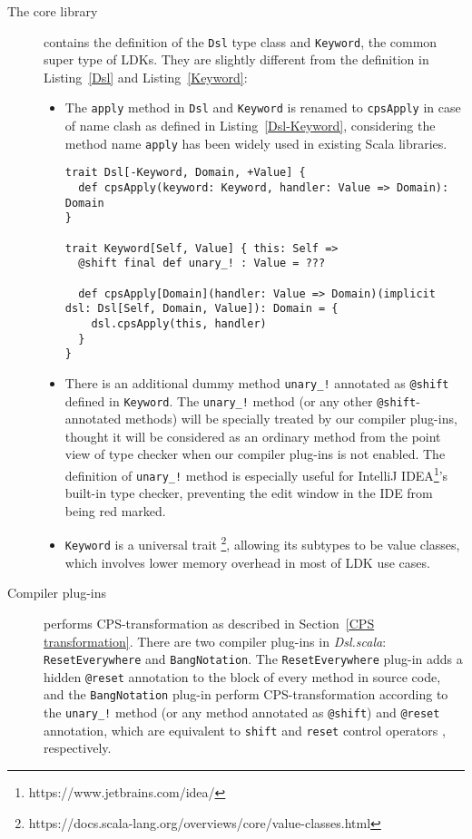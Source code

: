 \begin{description}
  \item[The core library] contains the definition of the \lstinline{Dsl} type class and \lstinline{Keyword}, the common super type of LDKs. They are slightly different from the definition in Listing~\ref{Dsl} and Listing~\ref{Keyword}:
  \begin{itemize}
    \item The \lstinline{apply} method in \lstinline{Dsl} and \lstinline{Keyword} is renamed to \lstinline{cpsApply} in case of name clash as defined in Listing~\ref{Dsl-Keyword}, considering the method name \lstinline{apply} has been widely used in existing Scala libraries.

    \begin{lstlisting}[caption={The definition of \lstinline{Dsl} and \lstinline{Keyword} in \textit{Dsl.scala}, renamed},label={Dsl-Keyword}]
trait Dsl[-Keyword, Domain, +Value] {
  def cpsApply(keyword: Keyword, handler: Value => Domain): Domain
}

trait Keyword[Self, Value] { this: Self =>
  @shift final def unary_! : Value = ???

  def cpsApply[Domain](handler: Value => Domain)(implicit dsl: Dsl[Self, Domain, Value]): Domain = {
    dsl.cpsApply(this, handler)
  }
}
    \end{lstlisting}


    \item There is an additional dummy method \lstinline{unary_!} annotated as \lstinline{@shift} defined in \lstinline{Keyword}. The \lstinline{unary_!} method (or any other \lstinline{@shift}-annotated methods) will be specially treated by our compiler plug-ins, thought it will be considered as an ordinary method from the point view of type checker when our compiler plug-ins is not enabled. The definition of \lstinline{unary_!} method is especially useful for IntelliJ IDEA\footnote{https://www.jetbrains.com/idea/}'s built-in type checker, preventing the edit window in the IDE from being red marked.
    \item \lstinline{Keyword} is a universal trait \footnote{https://docs.scala-lang.org/overviews/core/value-classes.html}, allowing its subtypes to be value classes, which involves lower memory overhead in most of LDK use cases.
  \end{itemize}
  \item[Compiler plug-ins] performs CPS-transformation as described in Section~\ref{CPS transformation}. There are two compiler plug-ins in \textit{Dsl.scala}: \lstinline{ResetEverywhere} and \lstinline{BangNotation}. The \lstinline{ResetEverywhere} plug-in adds a hidden \lstinline{@reset} annotation to the block of every method in source code, and the \lstinline{BangNotation} plug-in perform CPS-transformation according to the \lstinline{unary_!} method (or any method annotated as \lstinline{@shift}) and \lstinline{@reset} annotation, which are equivalent to \lstinline{shift} and \lstinline{reset} control operators \cite{Danvy89afunctional}, respectively.
  

\end{description}
